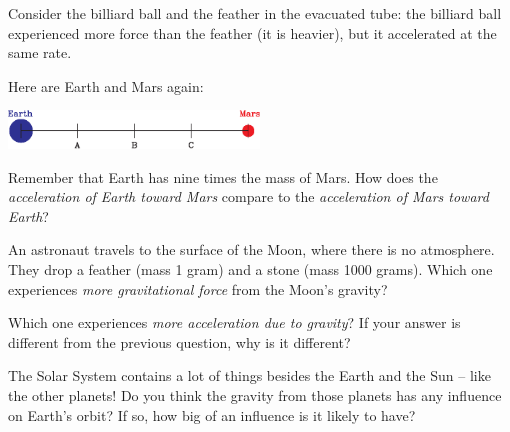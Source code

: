 \documentclass[12pt]{article}
\begin{document}
Consider the billiard ball and the feather in the evacuated tube: the billiard ball experienced more force than the feather (it is heavier), but it accelerated at the same rate.

\bigskip


Here are Earth and Mars again:

\begin{center}
	\includegraphics[width=0.5\textwidth]{earth-mars-crop.pdf}
\end{center}

Remember that Earth has nine times the mass of Mars. How does the {\it acceleration of Earth toward Mars} compare to the {\it acceleration of Mars toward Earth}?

\vspace{.7in}
	
	\newpage
	
An astronaut travels to the surface of the Moon, where there is no atmosphere. They drop a feather (mass 1 gram) and a stone (mass 1000 grams). Which one experiences {\it more gravitational force} from the Moon's gravity?

\vspace{2in}

Which one experiences {\it more acceleration due to gravity}? If your answer is different from the previous question, why is it different?

\vspace{2in}

The Solar System contains a lot of things besides the Earth and the Sun -- like the other planets! Do you think the gravity from those planets has any influence on Earth's orbit? If so, how big of an influence is it likely to have?

\newpage


	
\end{document}
